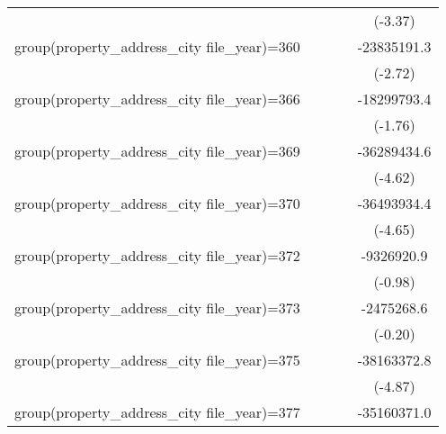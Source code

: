 {\begin{tabular}{l*{4}{c}}
                    &                     &                     &                     &     (-3.37)         \\
\addlinespace
group(property\_address\_city file\_year)=360&                     &                     &                     & -23835191.3\sym{**} \\
                    &                     &                     &                     &     (-2.72)         \\
\addlinespace
group(property\_address\_city file\_year)=366&                     &                     &                     & -18299793.4         \\
                    &                     &                     &                     &     (-1.76)         \\
\addlinespace
group(property\_address\_city file\_year)=369&                     &                     &                     & -36289434.6\sym{***}\\
                    &                     &                     &                     &     (-4.62)         \\
\addlinespace
group(property\_address\_city file\_year)=370&                     &                     &                     & -36493934.4\sym{***}\\
                    &                     &                     &                     &     (-4.65)         \\
\addlinespace
group(property\_address\_city file\_year)=372&                     &                     &                     &  -9326920.9         \\
                    &                     &                     &                     &     (-0.98)         \\
\addlinespace
group(property\_address\_city file\_year)=373&                     &                     &                     &  -2475268.6         \\
                    &                     &                     &                     &     (-0.20)         \\
\addlinespace
group(property\_address\_city file\_year)=375&                     &                     &                     & -38163372.8\sym{***}\\
                    &                     &                     &                     &     (-4.87)         \\
\addlinespace
group(property\_address\_city file\_year)=377&                     &                     &                     & -35160371.0\sym{***}\\

\end{tabular}}
